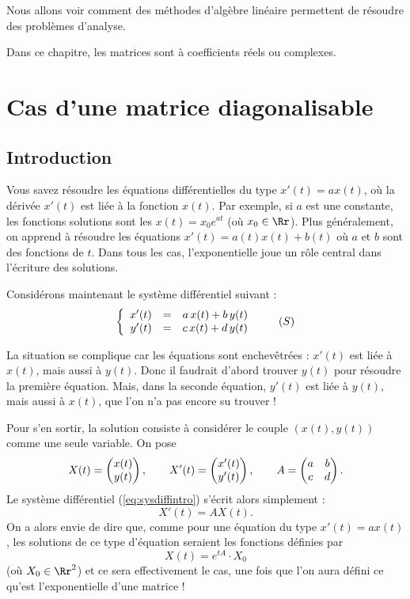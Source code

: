 \documentclass[12pt, class=report,crop=false]{standalone}
\begin{document}



Nous allons voir comment des méthodes d'algèbre linéaire 
permettent de résoudre des problèmes d'analyse.

Dans ce chapitre, les matrices sont à coefficients réels ou complexes.


\section{Cas d'une matrice diagonalisable}

\subsection{Introduction}


Vous savez résoudre les équations différentielles du type $x'(t) = a x(t)$, où 
la dérivée $x'(t)$ est liée à la fonction $x(t)$. Par exemple, si $a$ est une constante, les fonctions solutions sont les $x(t) = x_0 e^{at}$ (où $x_0 \in \Rr$). Plus généralement, on apprend à résoudre les équations 
$x'(t)=a(t)x(t)+b(t)$ où $a$ et $b$ sont des fonctions de $t$.
Dans tous les cas, l'exponentielle joue un rôle central dans l'écriture des solutions.

Considérons maintenant le système différentiel suivant :
\begin{equation}
\left\{\begin{array}{rcl}
x'(t) &=& a\,x(t)+b\,y(t)\cr
y'(t) &=& c\,x(t)+d\,y(t)
\end{array}\right.
\label{eq:sysdiffintro}\tag{$S$}
\end{equation}

La situation se complique car les équations sont enchevêtrées : $x'(t)$ est liée à $x(t)$, mais aussi à $y(t)$. Donc il faudrait d'abord trouver $y(t)$ pour résoudre la première équation. Mais, dans la seconde équation,
$y'(t)$ est liée à $y(t)$, mais aussi à $x(t)$, que l'on n'a pas encore su trouver !

Pour s'en sortir, la solution consiste à considérer le couple $(x(t),y(t))$ comme une seule variable.
On pose 
$$X(t) = \begin{pmatrix}x(t)\cr y(t)\end{pmatrix},\qquad
X'(t) = \begin{pmatrix}x'(t)\cr y'(t)\end{pmatrix},\qquad
A = \begin{pmatrix}a & b \cr c & d\end{pmatrix}.$$
Le système différentiel (\ref{eq:sysdiffintro}) s'écrit alors simplement :
$$X'(t) = A X(t).$$
On a alors envie de dire que, comme pour une équation du type $x'(t)=ax(t)$, les solutions de ce type d'équation seraient les fonctions définies par
$$X(t) =  e^{tA} \cdot X_0$$
(où $X_0 \in \Rr^2$) et ce sera effectivement le cas, une fois que l'on aura défini ce qu'est l'exponentielle d'une matrice !
\end{document}
